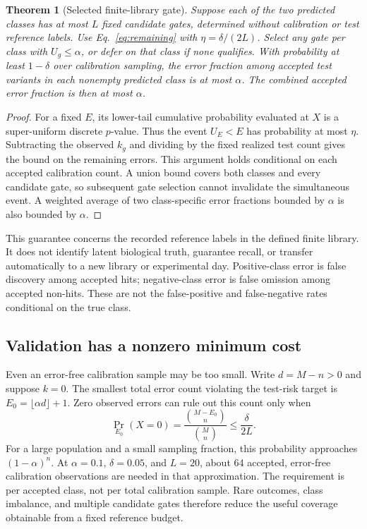 \documentclass[11pt,letterpaper]{article}
\newtheorem{theorem}{Theorem}
\begin{document}
\begin{theorem}[Selected finite-library gate]
Suppose each of the two predicted classes has at most $L$ fixed candidate gates, determined without calibration or test reference labels. Use Eq.~\eqref{eq:remaining} with $\eta=\delta/(2L)$. Select any gate per class with $U_g\leq\alpha$, or defer on that class if none qualifies. With probability at least $1-\delta$ over calibration sampling, the error fraction among accepted test variants in each nonempty predicted class is at most $\alpha$. The combined accepted error fraction is then at most $\alpha$.
\end{theorem}
\begin{proof}
For a fixed $E$, its lower-tail cumulative probability evaluated at $X$ is a super-uniform discrete $p$-value. Thus the event $U_E<E$ has probability at most $\eta$. Subtracting the observed $k_g$ and dividing by the fixed realized test count gives the bound on the remaining errors. This argument holds conditional on each accepted calibration count. A union bound covers both classes and every candidate gate, so subsequent gate selection cannot invalidate the simultaneous event. A weighted average of two class-specific error fractions bounded by $\alpha$ is also bounded by $\alpha$.
\end{proof}

This guarantee concerns the recorded reference labels in the defined finite library. It does not identify latent biological truth, guarantee recall, or transfer automatically to a new library or experimental day. Positive-class error is false discovery among accepted hits; negative-class error is false omission among accepted non-hits. These are not the false-positive and false-negative rates conditional on the true class.

\subsection{Validation has a nonzero minimum cost}
Even an error-free calibration sample may be too small. Write $d=M-n>0$ and suppose $k=0$. The smallest total error count violating the test-risk target is $E_0=\lfloor\alpha d\rfloor+1$. Zero observed errors can rule out this count only when
\begin{equation}
 \Pr_{E_0}(X=0)=\frac{\binom{M-E_0}{n}}{\binom{M}{n}}\leq\frac{\delta}{2L}.
 \label{eq:debt}
\end{equation}
For a large population and a small sampling fraction, this probability approaches $(1-\alpha)^n$. At $\alpha=0.1$, $\delta=0.05$, and $L=20$, about 64 accepted, error-free calibration observations are needed in that approximation. The requirement is per accepted class, not per total calibration sample. Rare outcomes, class imbalance, and multiple candidate gates therefore reduce the useful coverage obtainable from a fixed reference budget.
\end{document}
